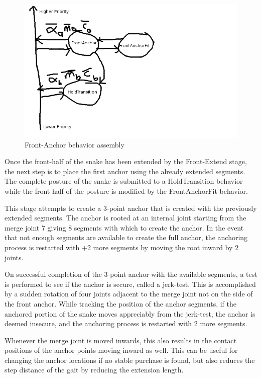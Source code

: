 \begin{figure}[htbp]
\centering
\includegraphics[keepaspectratio,width=400pt,height=0.75\textheight]{2_adaptive_2.png}
\caption{Front-Anchor behavior assembly}
\label{adaptive2}
\end{figure}





Once the front-half of the snake has been extended by the Front-Extend stage, the next step is to place the first anchor using the already extended segments. The complete posture of the snake is submitted to a HoldTransition behavior while the front half of the posture is modified by the FrontAnchorFit behavior.

This stage attempts to create a 3-point anchor that is created with the previously extended segments. The anchor is rooted at an internal joint starting from the merge joint 7 giving 8 segments with which to create the anchor. In the event that not enough segments are available to create the full anchor, the anchoring process is restarted with +2 more segments by moving the root inward by 2 joints. 

On successful completion of the 3-point anchor with the available segments, a test is performed to see if the anchor is secure, called a jerk-test. This is accomplished by a sudden rotation of four joints adjacent to the merge joint not on the side of the front anchor. While tracking the position of the anchor segments, if the anchored portion of the snake moves appreciably from the jerk-test, the anchor is deemed insecure, and the anchoring process is restarted with 2 more segments.

Whenever the merge joint is moved inwards, this also results in the contact positions of the anchor points moving inward as well. This can be useful for changing the anchor locations if no stable purchase is found, but also reduces the step distance of the gait by reducing the extension length.

